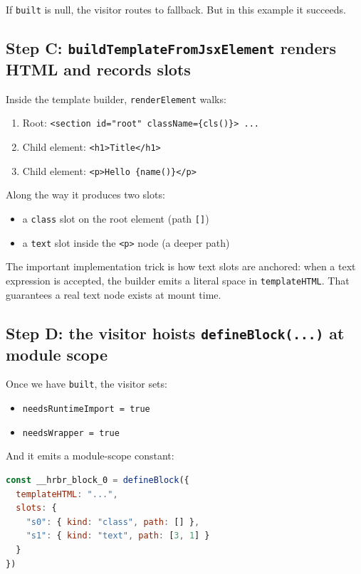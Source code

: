 If \texttt{built} is null, the visitor routes to fallback.
But in this example it succeeds.

\subsection{Step C: \texttt{buildTemplateFromJsxElement} renders HTML and records slots}

Inside the template builder, \texttt{renderElement} walks:

\begin{enumerate}
\item Root: \texttt{<section id="root" className=\{cls()\}> ...}
\item Child element: \texttt{<h1>Title</h1>}
\item Child element: \texttt{<p>Hello \{name()\}</p>}
\end{enumerate}

Along the way it produces two slots:

\begin{itemize}
\item a \texttt{class} slot on the root element (path \texttt{[]})
\item a \texttt{text} slot inside the \texttt{<p>} node (a deeper path)
\end{itemize}

The important implementation trick is how text slots are anchored:
when a text expression is accepted, the builder emits a literal space in \texttt{templateHTML}.
That guarantees a real text node exists at mount time.

\subsection{Step D: the visitor hoists \texttt{defineBlock(...)} at module scope}

Once we have \texttt{built}, the visitor sets:

\begin{itemize}
\item \texttt{needsRuntimeImport = true}
\item \texttt{needsWrapper = true}
\end{itemize}

And it emits a module-scope constant:

\begin{lstlisting}[language=JavaScript]
const __hrbr_block_0 = defineBlock({
  templateHTML: "...",
  slots: {
    "s0": { kind: "class", path: [] },
    "s1": { kind: "text", path: [3, 1] }
  }
})
\end{lstlisting}

